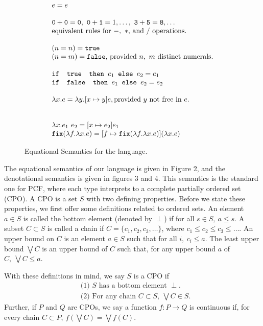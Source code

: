 \begin{figure}
\[
\begin{array}{lr}
e = e \\ \\
\texttt{0} + \texttt{0} = \texttt{0}, \ \texttt{0} + \texttt{1} = 1, \ldots, \ \texttt{3} + \texttt{5} = \texttt{8}, \ldots  \\
\text{equivalent rules for } -, \ * \text{, and } /\text{ operations.}
\\ \\
(n =n) = \texttt{true} \\ (n=m) = \texttt{false}\text{, provided } n, \ m \text{ distinct numerals.}\\ \\ 
\ifelse{\texttt{ true }}{e_1}{e_2} = e_1 \\
\ifelse{\texttt{ false }}{e_1}{e_2} = e_2 \\ \\ 
\lambda x.e = \lambda y.[x \mapsto y]e, \text{provided } y \text{ not free in } e. \\ \\ \\
\lambda x.e_1 \ e_2 = [x \mapsto e_2]e_1 \\
\texttt{fix}(\lambda f. \lambda x.e) = [f \mapsto \texttt{fix}(\lambda f.\lambda x.e)](\lambda x.e)
\end{array}
\]
\caption{Equational Semantics for the language.}
\label{fig:typing}
\end{figure}

The equational semantics of our language is given in Figure 2, and the denotational semantics is given in figures 3 and 4.
This semantics is the standard one for PCF, where each type interprets to a complete
partially ordered set (CPO). A CPO is a set $S$ with two defining properties. Before we state these properties,
we first offer some definitions related to ordered sets. An element $a \in S$ is called the bottom element (denoted by $\perp$) if for all $s \in S, \ a \leq s$. A subset $C \subset S$ is called a chain if $C = \{c_1, c_2, c_3, \dots\}$, where 
$c_1 \leq c_2 \leq c_3 \leq \dots$. An upper bound on $C$ is an element $a \in S$ such that for all $i, \ c_i \leq a$. 
The least upper bound $\bigvee C$ is an upper bound of $C$ such that, for any upper bound $a$ of $C, \ \bigvee C \leq a$.

With these definitions in mind, we say $S$ is a CPO if
\begin{align*}
&\text{(1) $S$ has a bottom element }\perp.\\
&\text{(2) For any chain }C \subset S, \ \bigvee C \in S. 
\end{align*}
Further, if $P$ and $Q$ are CPOs, we say a function $f: P \rightarrow Q$ is continuous if, for every chain $C \subset P$, 
$f(\bigvee C) = \bigvee f(C)$.

